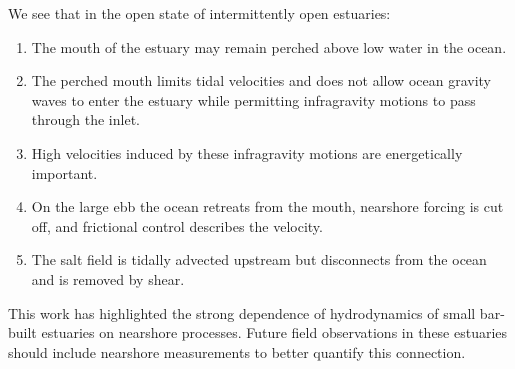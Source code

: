 We see that in the open state of intermittently open estuaries:
\begin{enumerate}
\item The mouth of the estuary may remain perched above low water in the
ocean.
\item The perched mouth limits tidal velocities and does not allow ocean
gravity waves to enter the estuary while permitting infragravity motions
to pass through the inlet.
\item High velocities induced by these infragravity motions are energetically
important.
\item On the large ebb the ocean retreats from the mouth, nearshore forcing
is cut off, and frictional control describes the velocity.
\item The salt field is tidally advected upstream but disconnects from the
ocean and is removed by shear.
\end{enumerate}
This work has highlighted the strong dependence of hydrodynamics of
small bar-built estuaries on nearshore processes. Future field observations
in these estuaries should include nearshore measurements to better
quantify this connection. 



